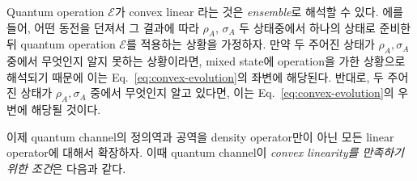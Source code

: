 Quantum operation $\mathcal E$가 convex linear 라는 것은 \textit{ensemble}로 해석할 수 있다. 에를 들어, 어떤 동전을 던져서 그 결과에 따라 $\rho_A$, $\sigma_A$ 두 상태중에서 하나의 상태로 준비한 뒤 quantum operation $\mathcal E$를 적용하는 상황을 가정하자. 만약 두 주어진 상태가 $\rho_A, \sigma_A$ 중에서 무엇인지 알지 못하는 상황이라면, mixed state에 operation을 가한 상황으로 해석되기 때문에 이는 Eq.~\eqref{eq:convex-evolution}의 좌변에 해당된다. 반대로, 두 주어진 상태가 $\rho_A, \sigma_A$ 중에서 무엇인지 알고 있다면, 이는 Eq.~\eqref{eq:convex-evolution}의 우변에 해당될 것이다.
\vspace{0.6em}

이제 quantum channel의 정의역과 공역을 density operator만이 아닌 모든 linear operator에 대해서 확장하자. 이때 quantum channel이 \textit{convex linearity를 만족하기 위한 조건}은 다음과 같다.
